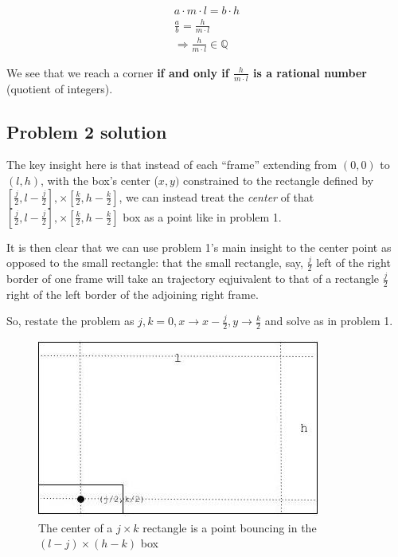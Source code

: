 \documentclass[11pt, oneside]{article} 	%
\begin{document}
\begin{align}
a \cdot m \cdot l = b \cdot h \\
\frac{a}{b} = \frac{h}{m \cdot l} \\ 
\Rightarrow \frac{h}{m \cdot l} \in \mathbb{Q} 
\end{align}

We see that we reach a corner \textbf{if and only if $\frac{h}{m \cdot l}$ is a rational number} (quotient of integers).



\subsection{Problem 2 solution}

The key insight here is that instead of each ``frame'' extending from $(0, 0)$ to $(l, h)$, with the box's center ($x, y)$ constrained to the rectangle defined by $[\frac{j}{2}, l - \frac{j}{2}], \times [\frac{k}{2}, h - \frac{k}{2}]$, we can instead treat the \emph{center} of that $[\frac{j}{2}, l - \frac{j}{2}], \times [\frac{k}{2}, h - \frac{k}{2}]$ box as a point like in problem 1.  

It is then clear that we can use problem 1's main insight to the center point as opposed to the small rectangle: that the small rectangle, say, $\frac{j}{2}$ left of the right border of one frame will take an trajectory eqjuivalent to that of a rectangle $\frac{j}{2}$ right of the left border of the adjoining right frame.

So, restate the problem as $j, k = 0, x \rightarrow x - \frac{j}{2}, y \rightarrow \frac{k}{2}$ and solve as in problem 1.

\begin{figure}[!htb]
\centering
\includegraphics[scale=.4]{problem2}
\caption{The center of a $j \times k$ rectangle is a point bouncing in the $(l - j) \times (h - k)$ box}
\end{figure}
\end{document}

